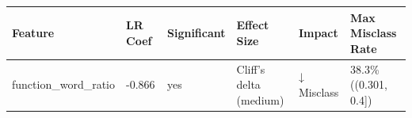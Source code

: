 \begin{tabular}{llllll}
\toprule
Feature & LR Coef & Significant & Effect Size & Impact & Max Misclass Rate \\
\midrule
function\_word\_ratio & -0.866 & yes & Cliff's delta (medium) & ↓ Misclass & 38.3\% ((0.301, 0.4]) \\
\bottomrule
\end{tabular}
